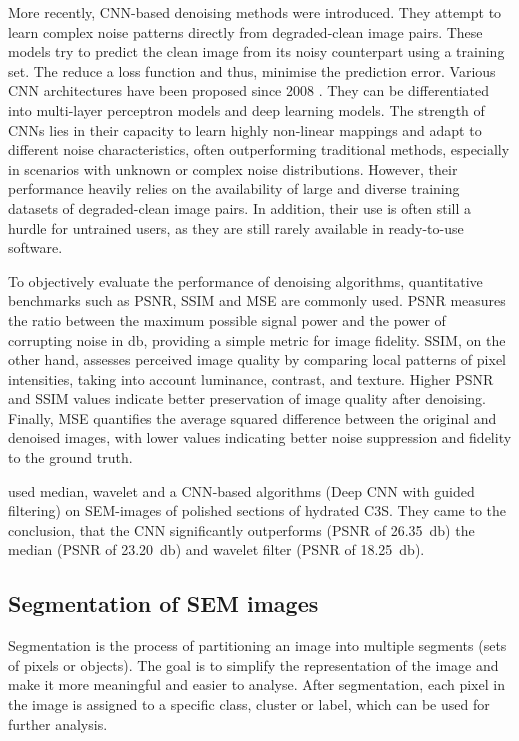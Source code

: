 More recently, \ac{CNN}-based denoising methods were introduced.
They attempt to learn complex noise patterns directly from degraded-clean image pairs.
These models try to predict the clean image from its noisy counterpart using a training set.
The reduce a loss function and thus, minimise the prediction error.
Various \ac{CNN} architectures have been proposed since 2008 \cite{jain.2008}.
They can be differentiated into multi-layer perceptron models and deep learning models.
The strength of \ac{CNN}s lies in their capacity to learn highly non-linear mappings and adapt to different noise characteristics, often outperforming traditional methods, especially in scenarios with unknown or complex noise distributions.
However, their performance heavily relies on the availability of large and diverse training datasets of degraded-clean image pairs.
In addition, their use is often still a hurdle for untrained users, as they are still rarely available in ready-to-use software.

To objectively evaluate the performance of denoising algorithms, quantitative benchmarks such as \ac{PSNR}, \ac{SSIM} and \ac{MSE} are commonly used.
\ac{PSNR} measures the ratio between the maximum possible signal power and the power of corrupting noise in \unit{\decibel}, providing a simple metric for image fidelity.
\ac{SSIM}, on the other hand, assesses perceived image quality by comparing local patterns of pixel intensities, taking into account luminance, contrast, and texture.
Higher \ac{PSNR} and \ac{SSIM} values indicate better preservation of image quality after denoising.
Finally, \ac{MSE} quantifies the average squared difference between the original and denoised images, with lower values indicating better noise suppression and fidelity to the ground truth.

\textcite{wang.2025} used median, wavelet and a \ac{CNN}-based algorithms (Deep \ac{CNN} with guided filtering) on \ac{SEM}-images of polished sections of hydrated \ac{C3S}.
They came to the conclusion, that the \ac{CNN} significantly outperforms (\ac{PSNR} of \qty{26.35}{\decibel}) the median (\ac{PSNR} of \qty{23.20}{\decibel}) and wavelet filter (\ac{PSNR} of \qty{18.25}{\decibel}).

\FloatBarrier
\subsection{Segmentation of \acs{SEM} images}
\label{sec:lit_segmentation}

Segmentation is the process of partitioning an image into multiple segments (sets of pixels or objects).
The goal is to simplify the representation of the image and make it more meaningful and easier to analyse.
After segmentation, each pixel in the image is assigned to a specific class, cluster or label, which can be used for further analysis.

